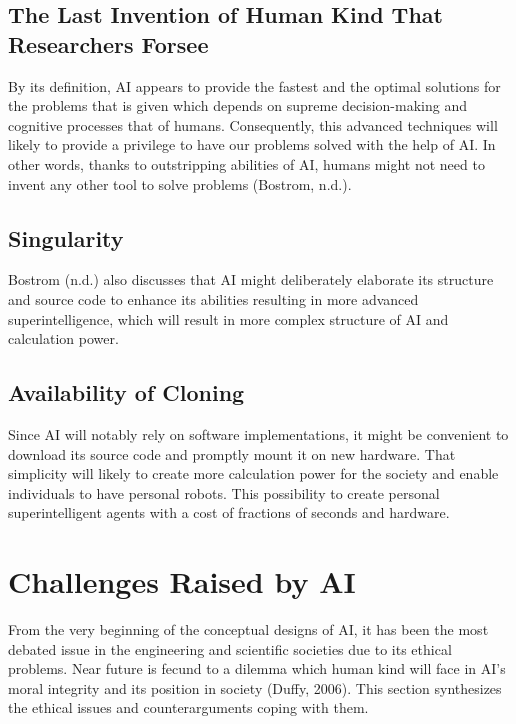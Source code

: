 \documentclass[man]{apa6}
\begin{document}
\subsection{The Last Invention of Human Kind That Researchers Forsee}
By its definition, AI appears to provide the fastest and the optimal solutions for the problems that is given which depends on supreme decision-making and cognitive processes that of humans. Consequently, this advanced techniques will likely to provide a privilege to have our problems solved with the help of AI. In other words, thanks to outstripping abilities of AI, humans might not need to invent any other tool to solve problems (Bostrom, n.d.).
\subsection{Singularity}
Bostrom (n.d.) also discusses that AI might deliberately elaborate its structure and source code to enhance its abilities resulting in more advanced superintelligence, which will result in more complex structure of AI and calculation power.
\subsection{Availability of Cloning}
Since AI will notably rely on software implementations, it might be convenient to download its source code and promptly mount it on new hardware. That simplicity will likely to create more calculation power for the society and enable individuals to have personal robots. This possibility to create personal superintelligent agents with a cost of fractions of seconds and hardware.
\section{Challenges Raised by AI}
From the very beginning of the conceptual designs of AI, it has been the most debated issue in the engineering and scientific societies due to its ethical problems. Near future is fecund to a dilemma which human kind will face in AI's moral integrity and its position in society (Duffy, 2006). This section synthesizes the ethical issues and counterarguments coping with them.
\end{document}
